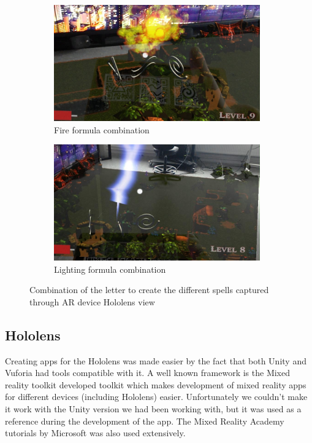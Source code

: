 \documentclass[sigchi, authorversion, screen]{acmart}
\begin{document}
\begin{figure}[ht]
 
\begin{subfigure}{0.5\textwidth}
\includegraphics[width=0.9\linewidth, height=5cm]{Images/fire.jpg}
\caption{Fire formula combination}
\label{fig:fire}
\end{subfigure}
\begin{subfigure}{0.5\textwidth}
\includegraphics[width=0.9\linewidth, height=5cm]{Images/lightning.jpg}
\caption{Lighting formula combination}
\label{fig:lightning}
\end{subfigure}
 
\caption{Combination of the letter to create the different spells captured through AR device Hololens view}
\label{fig:spell_combinations}
\end{figure}




\subsection{Hololens}


Creating apps for the Hololens was made easier by the fact that both Unity and Vuforia had tools compatible with it. A well known framework is the Mixed reality toolkit \cite{mixedtoolkit} developed toolkit which makes development of mixed reality apps for different devices (including Hololens) easier. Unfortunately we couldn’t make it work with the Unity version we had been working with, but it was used as a reference during the development of the app. The Mixed Reality Academy \cite{microsoft-academy} tutorials by Microsoft was also used extensively.
\end{document}

